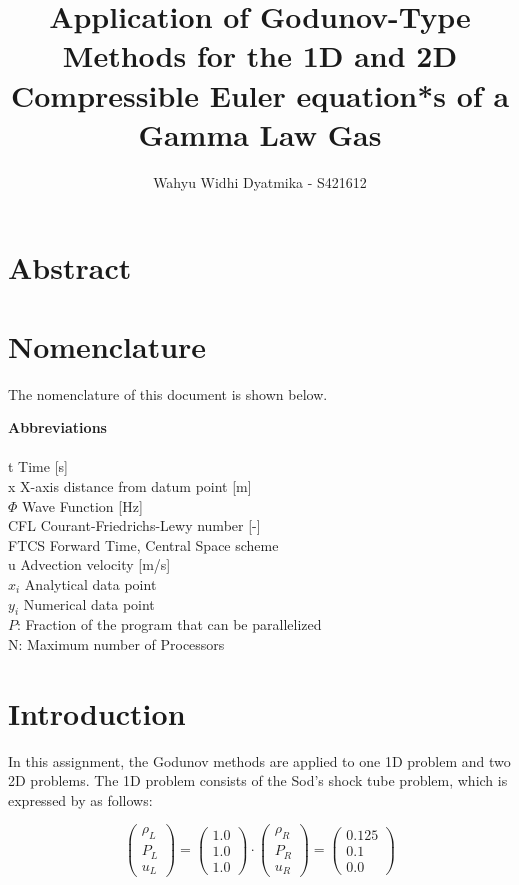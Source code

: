 \documentclass[11pt]{article}
\title{\textbf{Application of Godunov-Type Methods for the 1D and 2D Compressible Euler
equation*s of a Gamma Law Gas}}
\author{Wahyu Widhi Dyatmika - S421612}
\date{}
\begin{document}
\maketitle

\section{Abstract}


\section{Nomenclature}

The nomenclature of this document is shown below.
\begin{tabbing}
\textbf{Abbreviations} \= \\
\\
t \> Time [s]\\
x \> X-axis distance from datum point [m]\\
$\Phi$ \> Wave Function [Hz]\\
CFL \> Courant-Friedrichs-Lewy number [-]\\
FTCS \> Forward Time, Central Space scheme\\
u \>  Advection velocity [m/s]\\
$x_i$ \> Analytical data point\\
$y_i$ \> Numerical data point\\
$P$: \> Fraction of the program that can be parallelized\\
N: \> Maximum number of Processors
\end{tabbing}

\section{Introduction}
In this assignment, the Godunov methods are applied to one 1D problem and two 2D problems. The 1D problem consists of the Sod's shock tube problem, which is expressed by \citet{Sod1978} as follows:

\begin{equation*}
    \begin{pmatrix}
     \rho_L\\
     P_L\\
     u_L
     \end{pmatrix} =
      \begin{pmatrix}
     1.0\\
     1.0\\
     1.0
     \end{pmatrix} \cdot 
     \begin{pmatrix}
     \rho_R\\
     P_R\\
     u_R
     \end{pmatrix} =
     \begin{pmatrix}
     0.125\\
     0.1\\
     0.0
     \end{pmatrix}
\end{equation*}
\end{document}
